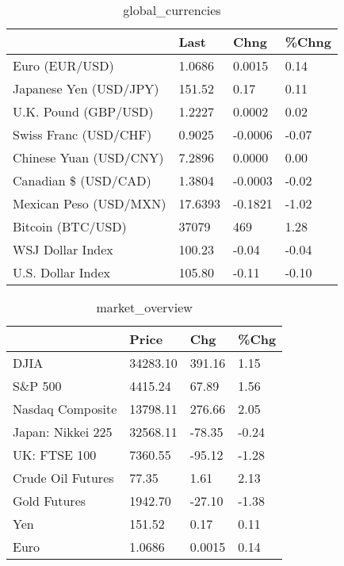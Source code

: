 \documentclass{article}%
\begin{document}
%


\begin{table}[htbp]%
\caption{global\_currencies}%
\centering%
\begin{adjustbox}{width=1\textwidth}%
\begin{tabular}{llll}
\toprule
                       &    Last &    Chng & \%Chng \\
\midrule
        Euro (EUR/USD) &  1.0686 &  0.0015 &  0.14 \\
Japanese Yen (USD/JPY) &  151.52 &    0.17 &  0.11 \\
  U.K. Pound (GBP/USD) &  1.2227 &  0.0002 &  0.02 \\
 Swiss Franc (USD/CHF) &  0.9025 & -0.0006 & -0.07 \\
Chinese Yuan (USD/CNY) &  7.2896 &  0.0000 &  0.00 \\
  Canadian \$ (USD/CAD) &  1.3804 & -0.0003 & -0.02 \\
Mexican Peso (USD/MXN) & 17.6393 & -0.1821 & -1.02 \\
     Bitcoin (BTC/USD) &   37079 &     469 &  1.28 \\
      WSJ Dollar Index &  100.23 &   -0.04 & -0.04 \\
     U.S. Dollar Index &  105.80 &   -0.11 & -0.10 \\
\bottomrule
\end{tabular}
%
\end{adjustbox}%
\end{table}

%


\begin{table}[htbp]%
\caption{market\_overview}%
\centering%
\begin{adjustbox}{width=1\textwidth}%
\begin{tabular}{llll}
\toprule
                  &    Price &    Chg &  \%Chg \\
\midrule
             DJIA & 34283.10 & 391.16 &  1.15 \\
          S\&P 500 &  4415.24 &  67.89 &  1.56 \\
 Nasdaq Composite & 13798.11 & 276.66 &  2.05 \\
Japan: Nikkei 225 & 32568.11 & -78.35 & -0.24 \\
     UK: FTSE 100 &  7360.55 & -95.12 & -1.28 \\
Crude Oil Futures &    77.35 &   1.61 &  2.13 \\
     Gold Futures &  1942.70 & -27.10 & -1.38 \\
              Yen &   151.52 &   0.17 &  0.11 \\
             Euro &   1.0686 & 0.0015 &  0.14 \\
\bottomrule
\end{tabular}
%
\end{adjustbox}%
\end{table}

%
\end{document}
